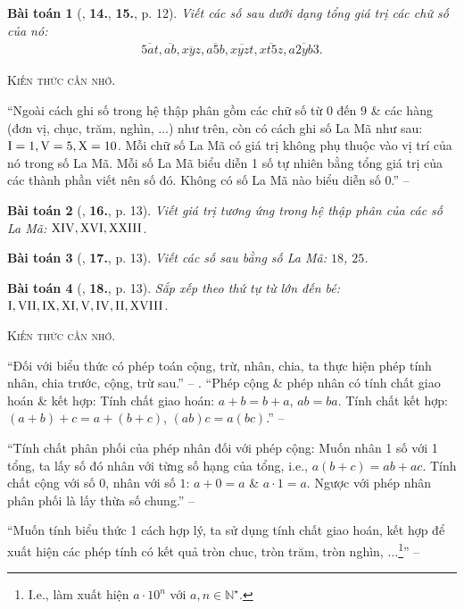 \documentclass{article}
\numberwithin{equation}{section}
\newtheorem{baitoan}{Bài toán}[section]
\begin{document}
\begin{baitoan}[\cite{Trong_Toan_6_2021}, \textbf{14.}, \textbf{15.}, p. 12]
	Viết các số sau dưới dạng tổng giá trị các chữ số của nó:
	\begin{align*}
		\overline{5at},\overline{ab},\overline{xyz},\overline{a5b},\overline{xyzt},\overline{xt5z},\overline{a2yb3}.
	\end{align*}
\end{baitoan}
\noindent\textsc{Kiến thức cần nhớ.}
\begin{tcolorbox}
	``Ngoài cách ghi số trong hệ thập phân gồm các chữ số từ $0$ đến $9$ \& các hàng (đơn vị, chục, trăm, nghìn, $\ldots$) như trên, còn có cách ghi số La Mã như sau: $\rm I = 1,V = 5,X = 10$. Mỗi chữ số La Mã có giá trị không phụ thuộc vào vị trí của nó trong số La Mã. Mỗi số La Mã biểu diễn 1 số tự nhiên bằng tổng giá trị của các thành phần viết nên số đó. Không có số La Mã nào biểu diễn số $0$.'' -- \cite[p. 13]{Trong_Toan_6_2021}
\end{tcolorbox}

\begin{baitoan}[\cite{Trong_Toan_6_2021}, \textbf{16.}, p. 13]
	Viết giá trị tương ứng trong hệ thập phân của các số La Mã: $\rm XIV,XVI,XXIII$.
\end{baitoan}

\begin{baitoan}[\cite{Trong_Toan_6_2021}, \textbf{17.}, p. 13]
	Viết các số sau bằng số La Mã: $18$, $25$.
\end{baitoan}

\begin{baitoan}[\cite{Trong_Toan_6_2021}, \textbf{18.}, p. 13]
	Sắp xếp theo thứ tự từ lớn đến bé: $\rm I,VII,IX,XI,V,IV,II,XVIII$.
\end{baitoan}
\noindent\textsc{Kiến thức cần nhớ.}
\begin{tcolorbox}
	``Đối với biểu thức có phép toán cộng, trừ, nhân, chia, ta thực hiện phép tính nhân, chia trước, cộng, trừ sau.'' -- \cite[p. 13]{Trong_Toan_6_2021}. ``Phép cộng \& phép nhân có tính chất giao hoán \& kết hợp: Tính chất giao hoán: $a + b = b + a$, $ab = ba$. Tính chất kết hợp: $(a + b) + c = a + (b + c)$, $(ab)c = a(bc)$.'' -- \cite[p. 14]{Trong_Toan_6_2021}
	
	``Tính chất phân phối của phép nhân đối với phép cộng: Muốn nhân 1 số với 1 tổng, ta lấy số đó nhân với từng số hạng của tổng, i.e., $a(b + c) = ab + ac$. Tính chất cộng với số $0$, nhân với số $1$: $a + 0 = a$ \& $a\cdot 1 = a$. Ngược với phép nhân phân phối là lấy thừa số chung.'' -- \cite[p. 14]{Trong_Toan_6_2021}
	
	``Muốn tính biểu thức 1 cách hợp lý, ta sử dụng tính chất giao hoán, kết hợp để xuất hiện các phép tính có kết quả tròn chuc, tròn trăm, tròn nghìn, $\ldots$\footnote{I.e., làm xuất hiện $a\cdot 10^n$ với $a,n\in\mathbb{N}^\star$.}'' -- \cite[p. 15]{Trong_Toan_6_2021}
\end{tcolorbox}
\end{document}
